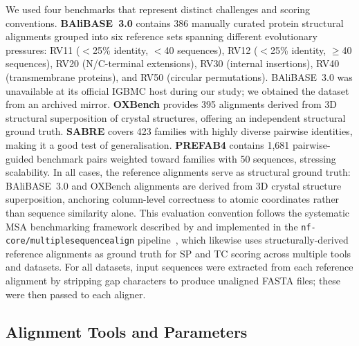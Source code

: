 \documentclass[unnumsec,webpdf,contemporary,large]{oup-authoring-template}
\begin{document}
We used four benchmarks that represent distinct challenges and scoring
conventions.
\textbf{BAliBASE~3.0} \citep{thompson2005balibase} contains 386 manually
curated protein structural alignments grouped into six reference sets
spanning different evolutionary pressures: RV11 ($<$25\% identity,
$<$40 sequences), RV12 ($<$25\% identity, $\ge$40 sequences), RV20
(N/C-terminal extensions), RV30 (internal insertions), RV40 (transmembrane
proteins), and RV50 (circular permutations).
BAliBASE~3.0 was unavailable at its official IGBMC host during our study;
we obtained the dataset from an archived mirror.
\textbf{OXBench} \citep{raghava2003oxbench} provides 395 alignments derived
from 3D structural superposition of crystal structures, offering an
independent structural ground truth.
\textbf{SABRE} \citep{blackshields2006sabre} covers 423 families with
highly diverse pairwise identities, making it a good test of generalisation.
\textbf{PREFAB4} \citep{edgar2004prefab} contains 1,681 pairwise-guided
benchmark pairs weighted toward families with 50 sequences, stressing
scalability.
In all cases, the reference alignments serve as structural ground truth:
BAliBASE~3.0 and OXBench alignments are derived from 3D crystal structure
superposition, anchoring column-level correctness to atomic coordinates
rather than sequence similarity alone.
This evaluation convention follows the systematic MSA benchmarking
framework described by \citet{santus2025nfcore} and implemented in the
\texttt{nf-core/multiplesequencealign} pipeline~\citep{nfcore2024msarepo},
which likewise uses structurally-derived reference alignments as ground
truth for SP and TC scoring across multiple tools and datasets.
For all datasets, input sequences were extracted from each reference
alignment by stripping gap characters to produce unaligned FASTA files;
these were then passed to each aligner.

\subsection{Alignment Tools and Parameters}
\end{document}

